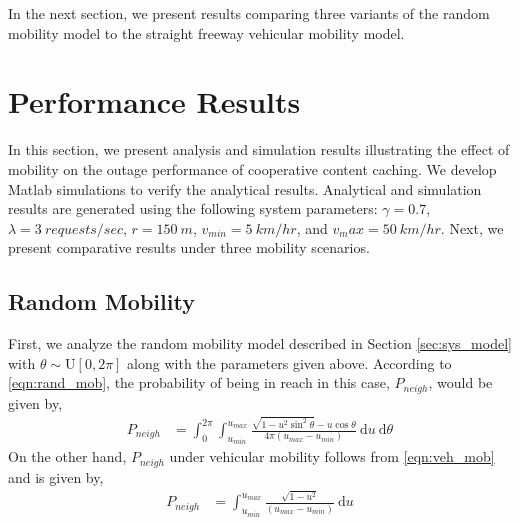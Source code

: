 \documentclass[conference,a4paper]{IEEEtran}
\begin{document}
In the next section, we present results comparing three variants of the random mobility model to the straight freeway vehicular mobility model.

\section{Performance Results \label{sec:results}}
In this section, we present analysis and simulation results illustrating the effect of mobility on the outage performance of cooperative content caching. We develop Matlab simulations to verify the analytical results. Analytical and simulation results are generated using the following system parameters: $\gamma = 0.7$, $\lambda = 3~requests/sec$, $r = 150~m$, $v_{min} = 5~km/hr$, and $v_max = 50~km/hr$. Next, we present comparative results under three mobility scenarios.

\subsection{Random Mobility\label{subsec:rand_mob_res}}
First, we analyze the random mobility model described in Section \ref{sec:sys_model} with $\theta \sim \mathrm{U}[0, 2\pi]$ along with the parameters given above. According to \eqref{eqn:rand_mob}, the probability of being in reach in this case, $P_{neigh}$, would be given by,
\begin{align}
P_{neigh} &= \int_{0}^{2\pi}{\int_{u_{min}}^{u_{max}}{\frac{\sqrt{1-u^2\sin^2{\theta}}-u\cos{\theta}}{4\pi(u_{max}-u_{min})}~\mathrm{d}u}~\mathrm{d}\theta}
\end{align}
On the other hand, $P_{neigh}$ under vehicular mobility follows from \eqref{eqn:veh_mob} and is given by,
\begin{align}
P_{neigh} &= \int_{u_{min}}^{u_{max}}{\frac{\sqrt{1-u^2}}{(u_{max}-u_{min})}}~\mathrm{d}u
\end{align}
\end{document}
